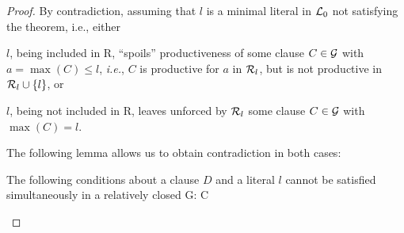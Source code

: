 \begin{proof} By contradiction, assuming that $l$ is a minimal literal 
in \(\mbox {$\cal L$}_0\) not satisfying the theorem, i.e., either
\begin{description}\smallerspaces
\item[B1.] $l$, being included in \C R, ``spoils'' productiveness of some 
  clause \(C\in\mbox {$\cal G$}\) with \(a=\max (C) \leq l\), {\em i.e.}, $C$ is
  productive for $a$ in \(\mbox {$\cal R$}_l\), but is not productive in \(\mbox {$\cal R$}_l\cup\{l\}\), or
\item[B2.] $l$, being not included in \C R, leaves unforced by \(\mbox {$\cal R$}_l\) 
  some clause \(C\in\mbox {$\cal G$}\) with \(\max (C)=l\).
\end{description}
The following lemma allows us to obtain contradiction in both cases:
\begin{lemma}\label {le:contradiction-way}
The following conditions about a clause $D$ and a literal $l$ cannot be 
satisfied simultaneously in a relatively closed \C G:
\newITEM C
\end{lemma}

\end{proof}
